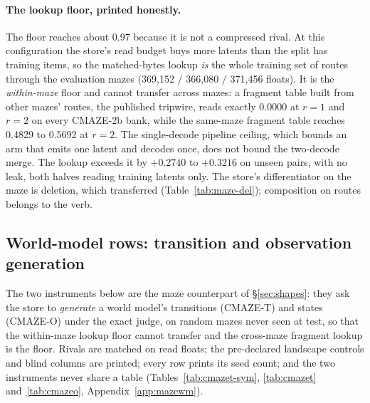 \documentclass{article} %
\begin{document}
\paragraph{The lookup floor, printed honestly.} The floor reaches about 0.97 because it is not a
compressed rival. At this configuration the store's read budget buys more latents than the split
has training items, so the matched-bytes lookup \emph{is} the whole training set of routes
through the evaluation mazes (369,152 / 366,080 / 371,456 floats). %
It is the \emph{within-maze} floor and cannot transfer across mazes: a fragment table built
from other mazes' routes, the published tripwire, reads exactly 0.0000 at $r=1$ and $r=2$ on
every CMAZE-2b bank, while the same-maze fragment table reaches 0.4829 to 0.5692 at $r=2$.
The single-decode pipeline ceiling, which bounds an arm that emits one latent and decodes once, does not bound the two-decode merge. The lookup exceeds it by $+0.2740$ to $+0.3216$ on unseen pairs,
with no leak, both halves reading training latents only.
The store's differentiator on the maze is deletion, which transferred (Table~\ref{tab:maze-del}); composition on routes belongs to the verb.

\subsection{World-model rows: transition and observation generation}
\label{sec:maze-wm}

The two instruments below are the maze counterpart of \S\ref{sec:shapes}: they ask the store to
\emph{generate} a world model's transitions (CMAZE-T) and states (CMAZE-O) under the exact judge,
on random mazes never seen at test, so that the within-maze lookup floor cannot transfer and the
cross-maze fragment lookup is the floor. Rivals are matched on read floats; the pre-declared
landscape controls and blind columns are printed; every row prints its seed count; and the two
instruments never share a table (Tables~\ref{tab:cmazet-sym}, \ref{tab:cmazet}
and~\ref{tab:cmazeo}, Appendix~\ref{app:mazewm}).
\end{document}
